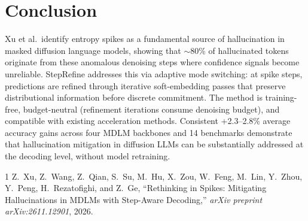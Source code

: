 \documentclass[11pt,a4paper]{article}
\begin{document}
\section{Conclusion}
Xu et al.\ identify entropy spikes as a fundamental source of hallucination in masked diffusion language models, showing that $\sim$80\% of hallucinated tokens originate from these anomalous denoising steps where confidence signals become unreliable. StepRefine addresses this via adaptive mode switching: at spike steps, predictions are refined through iterative soft-embedding passes that preserve distributional information before discrete commitment. The method is training-free, budget-neutral (refinement iterations consume denoising budget), and compatible with existing acceleration methods. Consistent +2.3--2.8\% average accuracy gains across four MDLM backbones and 14 benchmarks demonstrate that hallucination mitigation in diffusion LLMs can be substantially addressed at the decoding level, without model retraining.

\begin{thebibliography}{1}
Z.~Xu, Z.~Wang, Z.~Qian, S.~Su, M.~Hu, X.~Zou, W.~Feng, M.~Lin, Y.~Zhou, Y.~Peng, H.~Rezatofighi, and Z.~Ge,
``Rethinking in Spikes: Mitigating Hallucinations in MDLMs with Step-Aware Decoding,''
\textit{arXiv preprint arXiv:2611.12901}, 2026.
\end{thebibliography}
\end{document}
